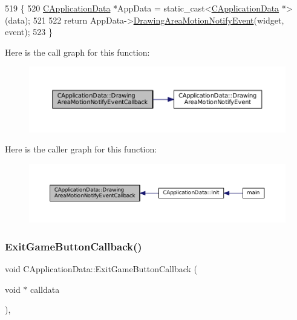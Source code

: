 \begin{DoxyCode}
519                                                                                                            
                 \{
520     \hyperlink{classCApplicationData}{CApplicationData} *AppData = \textcolor{keyword}{static\_cast<}\hyperlink{classCApplicationData}{CApplicationData} *\textcolor{keyword}{>}(data);
521 
522     \textcolor{keywordflow}{return} AppData->\hyperlink{classCApplicationData_a9b53201c01b399df18b02d1e93213e45}{DrawingAreaMotionNotifyEvent}(widget, event);
523 \}
\end{DoxyCode}
Here is the call graph for this function\+:\nopagebreak
\begin{figure}[H]
\begin{center}
\leavevmode
\includegraphics[width=350pt]{classCApplicationData_a463a4bc8eabe67f9f22c46d96f5eff88_cgraph}
\end{center}
\end{figure}
Here is the caller graph for this function\+:\nopagebreak
\begin{figure}[H]
\begin{center}
\leavevmode
\includegraphics[width=350pt]{classCApplicationData_a463a4bc8eabe67f9f22c46d96f5eff88_icgraph}
\end{center}
\end{figure}
\hypertarget{classCApplicationData_a6a2c934fee258ccdb2a4a70c075f79fd}{}\label{classCApplicationData_a6a2c934fee258ccdb2a4a70c075f79fd} 
\subsubsection{\texorpdfstring{Exit\+Game\+Button\+Callback()}{ExitGameButtonCallback()}}
{\footnotesize\ttfamily void C\+Application\+Data\+::\+Exit\+Game\+Button\+Callback (\begin{DoxyParamCaption}\item[{void $\ast$}]{calldata }\end{DoxyParamCaption})\hspace{0.3cm}{\ttfamily [static]}, {\ttfamily [protected]}}



